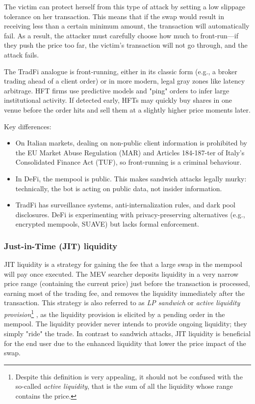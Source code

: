 \documentclass[a4paper,11pt]{article}
\begin{document}
The victim can protect herself from this type of attack by setting a low slippage tolerance on her transaction. This means that if the swap would result in receiving less than a certain minimum amount, the transaction will automatically fail. As a result, the attacker must carefully choose how much to front-run—if they push the price too far, the victim’s transaction will not go through, and the attack fails.

The TradFi analogue is front-running, either in its classic form (e.g., a broker trading ahead of a client order) or in more modern, legal gray zones like latency arbitrage. HFT firms use predictive models and "ping" orders to infer large institutional activity. If detected early, HFTs may quickly buy shares in one venue before the order hits and sell them at a slightly higher price moments later.

Key differences:
\begin{itemize}
    \item On Italian markets, dealing on non-public client information is prohibited by the EU Market Abuse Regulation (MAR) and Articles 184-187-ter of Italy’s Consolidated Finance Act (TUF), so front-running is a criminal behaviour.
    \item In DeFi, the mempool is public. This makes sandwich attacks legally murky: technically, the bot is acting on public data, not insider information.
    \item TradFi has surveillance systems, anti-internalization rules, and dark pool disclosures. DeFi is experimenting with privacy-preserving alternatives (e.g., encrypted mempools, SUAVE) but lacks formal enforcement.
\end{itemize}

\subsubsection{Just-in-Time (JIT) liquidity}
JIT liquidity is a strategy for gaining the fee that a large swap in the mempool will pay once executed. The MEV searcher deposits liquidity in a very narrow price range (containing the current price) just before the transaction is processed, earning most of the trading fee, and removes the liquidity immediately after the transaction. This strategy is also referred to as \textit{LP sandwich} or \textit{active liquidity provision}\footnote{Despite this definition is very appealing, it should not be confused with the so-called \textit{active liquidity}, that is the sum of all the liquidity whose range contains the price.} \cite{capponi2023paradox}, as the liquidity provision is elicited by a pending order in the mempool. The liquidity provider never intends to provide ongoing liquidity; they simply "ride" the trade. In contrast to sandwich attacks, JIT liquidity is beneficial for the end user due to the enhanced liquidity that lower the price impact of the swap.
\end{document}
